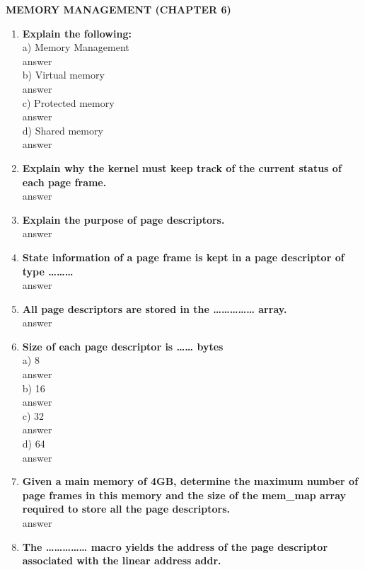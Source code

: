 \documentclass[a4paper,12pt]{article}
\begin{document}
\begin{flushleft}
\textbf{MEMORY MANAGEMENT (CHAPTER 6)}

\begin{enumerate}
\item \textbf{  Explain the following:}\\
a) Memory Management\\{\color{red}answer}\\
b) Virtual memory\\{\color{red}answer}\\
c) Protected memory\\{\color{red}answer}\\
d) Shared memory\\{\color{red}answer}\\
\item \textbf{ Explain why the kernel must keep track of the current status of each page frame.}\\
{\color{red}answer}\\
\item \textbf{  Explain the purpose of page descriptors.}\\
{\color{red}answer}\\
\item \textbf{ State information of a page frame is kept in a page descriptor of type ………}\\
{\color{red}answer}\\
\item \textbf{  All page descriptors are stored in the …………… array.}\\
{\color{red}answer}\\
\item \textbf{  Size of each page descriptor is …… bytes}\\
a) 8\\{\color{red}answer}\\
 b) 16\\ {\color{red}answer}\\
 c) 32\\ {\color{red}answer}\\
 d) 64\\{\color{red}answer}\\
\item \textbf{  Given a main memory of 4GB, determine the maximum number of page frames in this memory and the size of the mem\_map array required to store all the page descriptors.}\\
{\color{red}answer}\\
\item \textbf{  The …………… macro yields the address of the page descriptor associated with the linear address addr.}\\

\end{enumerate}
\end{flushleft}
\end{document}
